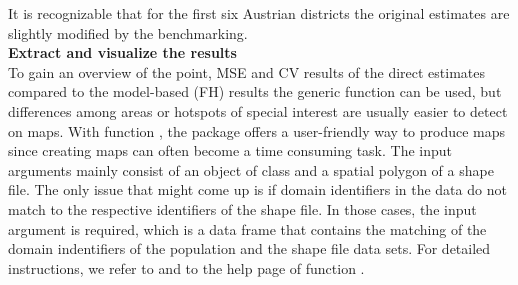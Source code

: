 It is recognizable that for the first six Austrian districts the original estimates are slightly modified by the benchmarking.
\\ \newline
\textbf{Extract and visualize the results} \\
To gain an overview of the point, MSE and CV results of the direct estimates compared to the model-based (FH) results the generic function  \citep{emdi2019} can be used, but differences among areas or hotspots of special interest are usually easier to detect on maps. With function , the  package offers a user-friendly way to produce maps since creating maps can often become a time consuming task. The input arguments mainly consist of an object of class  and a spatial polygon of a shape file. The only issue that might come up is if domain identifiers in the data do not match to the respective identifiers of the shape file. In those cases, the input argument  is required, which is a data frame that contains the matching of the domain indentifiers of the population and the shape file data sets. For detailed instructions, we refer to \citet{emdi2019} and to the help page of function .

